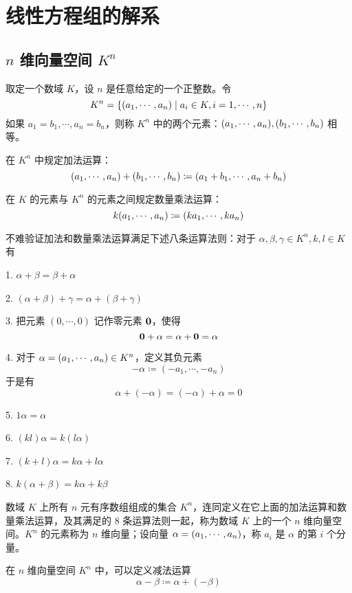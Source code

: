 
\chapter{线性方程组的解系}

\section{\texorpdfstring{$n$ 维向量空间 $K^n$}{n 维向量空间 Kn}}

取定一个数域 $K$，设 $n$ 是任意给定的一个正整数。令
\[K^n=\{(a_1,\cdots,a_n) \mid a_i\in K,i=1,\cdots,n\}\]
如果 $a_1=b_1,\cdots,a_n=b_n$，则称 $K^n$ 中的两个元素：$(a_1,\cdots,a_n),(b_1,\cdots,b_n)$ 相等。

在 $K^n$ 中规定加法运算：
\[(a_1,\cdots,a_n)+(b_1,\cdots,b_n)\coloneqq (a_1+b_1,\cdots,a_n+b_n)\]

在 $K$ 的元素与 $K^n$ 的元素之间规定数量乘法运算：
\[k(a_1,\cdots,a_n) \coloneqq  (ka_1,\cdots,ka_n)\]

不难验证加法和数量乘法运算满足下述八条运算法则：对于 $\alpha,\beta,\gamma\in K^n,k,l\in K$ 有

1. $\alpha+\beta=\beta+\alpha$

2. $(\alpha+\beta)+\gamma=\alpha+(\beta+\gamma)$

3. 把元素 $(0,\cdots,0)$ 记作零元素 $\boldsymbol{0}$，使得
\[\boldsymbol{0} + \alpha = \alpha + \boldsymbol{0} = \alpha\]

4. 对于 $\alpha = (a_1,\cdots,a_n)\in K^n$，定义其负元素
\[-\alpha \coloneqq  (-a_1,\cdots,-a_n)\]
于是有
\[\alpha + (-\alpha) = (-\alpha)+\alpha = 0\]

5. $1\alpha = \alpha$

6. $(kl)\alpha = k(l\alpha)$

7. $(k+l)\alpha = k\alpha + l\alpha$

8. $k (\alpha+\beta) = k\alpha + k\beta$

\begin{definition}[$n$ 维向量空间]
	数域 $K$ 上所有 $n$ 元有序数组组成的集合 $K^n$，连同定义在它上面的加法运算和数量乘法运算，及其满足的 8 条运算法则一起，称为数域 $K$ 上的一个 $n$ 维向量空间。$K^n$ 的元素称为 $n$ 维向量；设向量 $\alpha  = (a_1,\cdots,a_n)$，称 $a_i$ 是 $\alpha$ 的第 $i$ 个分量。
\end{definition}

在 $n$ 维向量空间 $K^n$ 中，可以定义减法运算
\[\alpha - \beta \coloneqq  \alpha + (-\beta)\]

